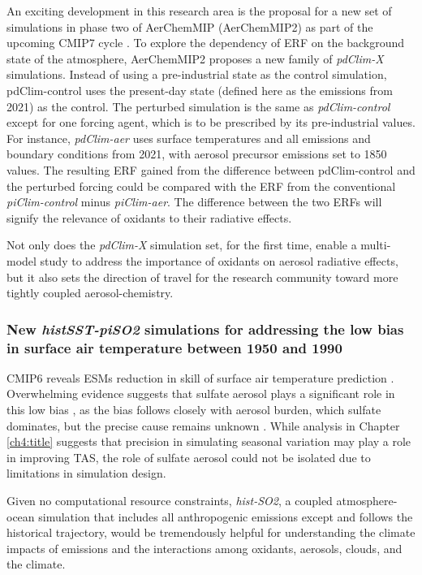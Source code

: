 An exciting development in this research area is the proposal for a new set of simulations in phase two of AerChemMIP (AerChemMIP2) as part of the upcoming CMIP7 cycle \citep[][]{fiedlerAerChemMIP2NdashUnraveling2025}. To explore the dependency of ERF on the background state of the atmosphere, AerChemMIP2 proposes a new family of \textit{pdClim-X} simulations. Instead of using a pre-industrial state as the control simulation, pdClim-control uses the present-day state (defined here as the emissions from 2021) as the control. The perturbed simulation is the same as \textit{pdClim-control} except for one forcing agent, which is to be prescribed by its pre-industrial values. For instance, \textit{pdClim-aer} uses surface temperatures and all emissions and boundary conditions from 2021, with aerosol precursor emissions set to 1850 values. The resulting ERF gained from the difference between pdClim-control and the perturbed forcing could be compared with the ERF from the conventional \textit{piClim-control} minus \textit{piClim-aer}. The difference between the two ERFs will signify the relevance of oxidants to their radiative effects. 

Not only does the \textit{pdClim-X} simulation set, for the first time, enable a multi-model study to address the importance of oxidants on aerosol radiative effects, but it also sets the direction of travel for the research community toward more tightly coupled aerosol-chemistry.


\subsubsection{New \textit{histSST-piSO2} simulations for addressing the low bias in surface air temperature between 1950 and 1990}


CMIP6 reveals ESMs reduction in skill of surface air temperature prediction \citep[][]{flynnStrongAerosolCooling2023}. Overwhelming evidence suggests that sulfate aerosol plays a significant role in this low bias \citep[][]{zhangRoleAnthropogenicAerosols2021}, as the bias follows closely with aerosol burden, which sulfate dominates, but the precise cause remains unknown \citep[][]{zhangRoleAnthropogenicAerosols2021,flynnStrongAerosolCooling2023}. While analysis in Chapter \ref{ch4:title} suggests that precision in simulating seasonal variation may play a role in improving TAS, the role of sulfate aerosol could not be isolated due to limitations in simulation design. 


Given no computational resource constraints, \textit{hist-SO2}, a coupled atmosphere-ocean simulation that includes all anthropogenic emissions except  and follows the historical trajectory, would be tremendously helpful for understanding the climate impacts of  emissions and the interactions among oxidants, aerosols, clouds, and the climate. 


